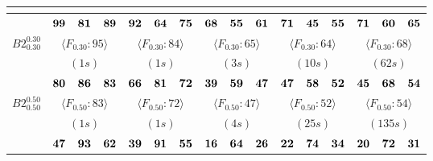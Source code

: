 \documentclass[12pt]{article}
\theoremstyle{thmstyleone}%
\theoremstyle{definition}
\begin{document}
\begin{table}[!ht]
\begin{tabular}{| l | c c c  | c c c | c c c | c c c | c c c | }
\multicolumn{1}{c}{}& \multicolumn{15}{c}{} \\ \hline
& $\bf 99$ & $\bf 81$ & $\bf 89$ & $\bf 92$ & $\bf 64$ & $\bf 75$ & $\bf 68$ & $\bf 55$ & $\bf 61$ & $\bf 71$ & $\bf 45$ & $\bf 55$ & $\bf 71$ & $\bf 60$ & $\bf 65$ \\

\textbf{$B2^{0.30}_{0.30}$}& \multicolumn{3}{c|}{$\langle F_{0.30}:95 \rangle$ }& \multicolumn{3}{c|}{$\langle F_{0.30}:84 \rangle$ }& \multicolumn{3}{c|}{$\langle F_{0.30}:65 \rangle$ }& \multicolumn{3}{c|}{$\langle F_{0.30}:64 \rangle$ }& \multicolumn{3}{c|}{$\langle F_{0.30}:68 \rangle$ } \\
& \multicolumn{3}{c|}{$(1s)$}& \multicolumn{3}{c|}{$(1s)$}& \multicolumn{3}{c|}{$(3s)$}& \multicolumn{3}{c|}{$(10s)$}& \multicolumn{3}{c|}{$(62s)$} \\ \hline
& $\bf 80$ & $\bf 86$ & $\bf 83$ & $\bf 66$ & $\bf 81$ & $\bf 72$ & $\bf 39$ & $\bf 59$ & $\bf 47$ & $\bf 47$ & $\bf 58$ & $\bf 52$ & $\bf 45$ & $\bf 68$ & $\bf 54$ \\

\textbf{$B2^{0.50}_{0.50}$}& \multicolumn{3}{c|}{$\langle F_{0.50}:83 \rangle$ }& \multicolumn{3}{c|}{$\langle F_{0.50}:72 \rangle$ }& \multicolumn{3}{c|}{$\langle F_{0.50}:47 \rangle$ }& \multicolumn{3}{c|}{$\langle F_{0.50}:52 \rangle$ }& \multicolumn{3}{c|}{$\langle F_{0.50}:54 \rangle$ } \\
& \multicolumn{3}{c|}{$(1s)$}& \multicolumn{3}{c|}{$(1s)$}& \multicolumn{3}{c|}{$(4s)$}& \multicolumn{3}{c|}{$(25s)$}& \multicolumn{3}{c|}{$(135s)$} \\ \hline
& $\bf 47$ & $\bf 93$ & $\bf 62$ & $\bf 39$ & $\bf 91$ & $\bf 55$ & $\bf 16$ & $\bf 64$ & $\bf 26$ & $\bf 22$ & $\bf 74$ & $\bf 34$ & $\bf 20$ & $\bf 72$ & $\bf 31$ \\


\end{tabular}
\end{table}
\end{document}
